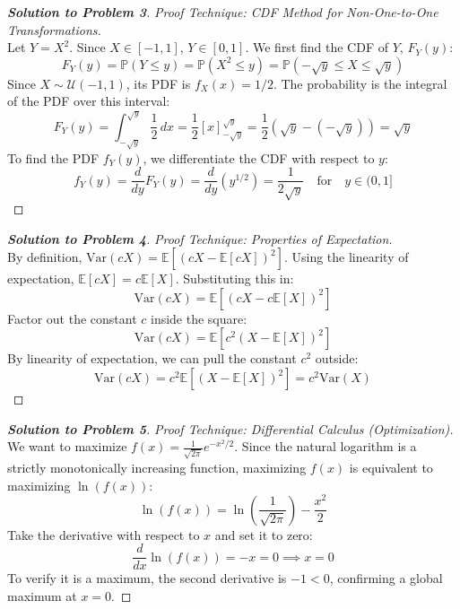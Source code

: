 \documentclass[11pt, a4paper]{article}
\theoremstyle{definition}
\theoremstyle{remark}
\newcommand{\E}{\mathbb{E}}
\newcommand{\Prob}{\mathbb{P}}
\begin{document}
\begin{proof}[\textbf{Solution to Problem 3}]
\textit{Proof Technique: CDF Method for Non-One-to-One Transformations.} \\
Let $Y = X^2$. Since $X \in [-1, 1]$, $Y \in [0, 1]$. We first find the CDF of $Y$, $F_Y(y)$:
\[ F_Y(y) = \Prob(Y \leq y) = \Prob(X^2 \leq y) = \Prob(-\sqrt{y} \leq X \leq \sqrt{y}) \]
Since $X \sim \mathcal{U}(-1, 1)$, its PDF is $f_X(x) = 1/2$. The probability is the integral of the PDF over this interval:
\[ F_Y(y) = \int_{-\sqrt{y}}^{\sqrt{y}} \frac{1}{2} \, dx = \frac{1}{2} \left[ x \right]_{-\sqrt{y}}^{\sqrt{y}} = \frac{1}{2} (\sqrt{y} - (-\sqrt{y})) = \sqrt{y} \]
To find the PDF $f_Y(y)$, we differentiate the CDF with respect to $y$:
\[ f_Y(y) = \frac{d}{dy} F_Y(y) = \frac{d}{dy} (y^{1/2}) = \frac{1}{2\sqrt{y}} \quad \text{for} \quad y \in (0, 1] \]
\end{proof}

\begin{proof}[\textbf{Solution to Problem 4}]
\textit{Proof Technique: Properties of Expectation.} \\
By definition, $\text{Var}(cX) = \E[(cX - \E[cX])^2]$.
Using the linearity of expectation, $\E[cX] = c\E[X]$. Substituting this in:
\[ \text{Var}(cX) = \E[(cX - c\E[X])^2] \]
Factor out the constant $c$ inside the square:
\[ \text{Var}(cX) = \E[c^2(X - \E[X])^2] \]
By linearity of expectation, we can pull the constant $c^2$ outside:
\[ \text{Var}(cX) = c^2\E[(X - \E[X])^2] = c^2\text{Var}(X) \]
\end{proof}

\begin{proof}[\textbf{Solution to Problem 5}]
\textit{Proof Technique: Differential Calculus (Optimization).} \\
We want to maximize $f(x) = \frac{1}{\sqrt{2\pi}}e^{-x^2/2}$. Since the natural logarithm is a strictly monotonically increasing function, maximizing $f(x)$ is equivalent to maximizing $\ln(f(x))$:
\[ \ln(f(x)) = \ln\left(\frac{1}{\sqrt{2\pi}}\right) - \frac{x^2}{2} \]
Take the derivative with respect to $x$ and set it to zero:
\[ \frac{d}{dx} \ln(f(x)) = -x = 0 \implies x = 0 \]
To verify it is a maximum, the second derivative is $-1 < 0$, confirming a global maximum at $x = 0$.
\end{proof}
\end{document}
